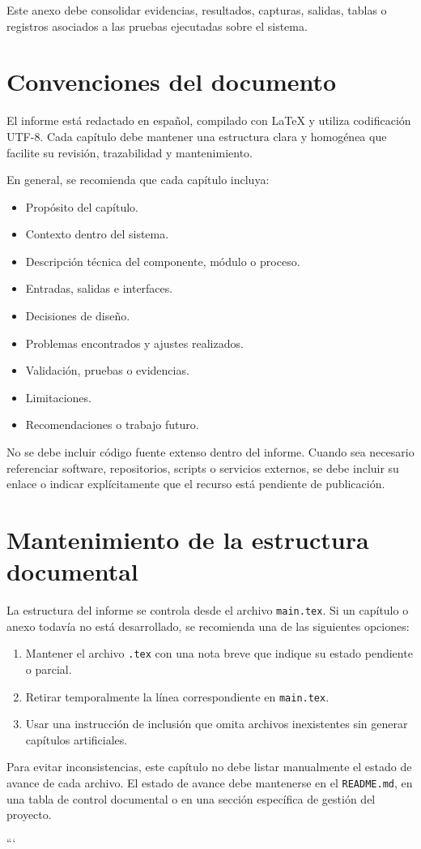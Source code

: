 Este anexo debe consolidar evidencias, resultados, capturas, salidas, tablas o registros asociados a las pruebas ejecutadas sobre el sistema.

\section{Convenciones del documento}

El informe está redactado en español, compilado con \LaTeX{} y utiliza codificación UTF-8. Cada capítulo debe mantener una estructura clara y homogénea que facilite su revisión, trazabilidad y mantenimiento.

En general, se recomienda que cada capítulo incluya:

\begin{itemize}[leftmargin=*]
    \item Propósito del capítulo.
    \item Contexto dentro del sistema.
    \item Descripción técnica del componente, módulo o proceso.
    \item Entradas, salidas e interfaces.
    \item Decisiones de diseño.
    \item Problemas encontrados y ajustes realizados.
    \item Validación, pruebas o evidencias.
    \item Limitaciones.
    \item Recomendaciones o trabajo futuro.
\end{itemize}

No se debe incluir código fuente extenso dentro del informe. Cuando sea necesario referenciar software, repositorios, scripts o servicios externos, se debe incluir su enlace o indicar explícitamente que el recurso está pendiente de publicación.

\section{Mantenimiento de la estructura documental}

La estructura del informe se controla desde el archivo \texttt{main.tex}. Si un capítulo o anexo todavía no está desarrollado, se recomienda una de las siguientes opciones:

\begin{enumerate}[leftmargin=*]
    \item Mantener el archivo \texttt{.tex} con una nota breve que indique su estado pendiente o parcial.
    \item Retirar temporalmente la línea correspondiente en \texttt{main.tex}.
    \item Usar una instrucción de inclusión que omita archivos inexistentes sin generar capítulos artificiales.
\end{enumerate}

Para evitar inconsistencias, este capítulo no debe listar manualmente el estado de avance de cada archivo. El estado de avance debe mantenerse en el \texttt{README.md}, en una tabla de control documental o en una sección específica de gestión del proyecto.


```
